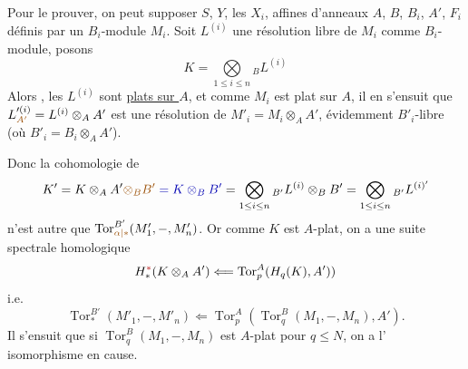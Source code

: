  Pour le prouver, on peut supposer $S$, $Y$, les $X_i$,  affines d'anneaux $A$, $B$, $B_i$, $A'$,  $F_i$ définis par  un $B_i$-module $M_i$. Soit $L^{(i)}$ une résolution libre de $M_i$ comme $B_i$-module, posons
\[
K=\mathop{\bigotimes}\limits_{1\leq i\leq n}{}_{B}L^{(i)}
\]
Alors , les $L^{(i)}$ sont \uline{plats sur $A$}, et comme $M_i$ est plat sur $A$, il en s'ensuit que $L'^{(i)}_{\deleted{\unsure{A'}}}=L^{(i)}\otimes_A A'$ est une résolution de $M'_i=M_i\otimes_A A'$, évidemment $B'_i$-libre (où $B'_i=B_i\otimes_A A'$).

Donc la cohomologie de
\[
K'=K\otimes_A A'\deleted{\unsure{\otimes_B B'}}\inserted{{}=K\otimes_B B'}=\mathop{\bigotimes}\limits_{1\leq i\leq n}{}_{B'}L^{(i)}\otimes_B B'=\mathop{\bigotimes}\limits_{1\leq i\leq n}{}_{B'}L^{(i)'}
\]
n'est autre que $\operatorname{Tor}_{\unsure{\alpha|*}}^{B'}(M'_1,-,M'_n)$. Or comme $K$ est $A$-plat, on a une suite spectrale homologique
\[
H_{*}^{\deleted{*}}(K\otimes_A A')\Longleftarrow\operatorname{Tor}_p^A(H_q(K),A'))
\]
i.e.
\[
\operatorname{Tor}_*^{B'}(M'_1,-,M'_n)\Longleftarrow\operatorname{Tor}_p^A(\operatorname{Tor}_q^B(M_1,-,M_n),A').
\]
Il s'ensuit que si $\operatorname{Tor}_q^B(M_1,-,M_n)$ est $A$-plat pour $q\leq N$, on a l' isomorphisme en cause.


